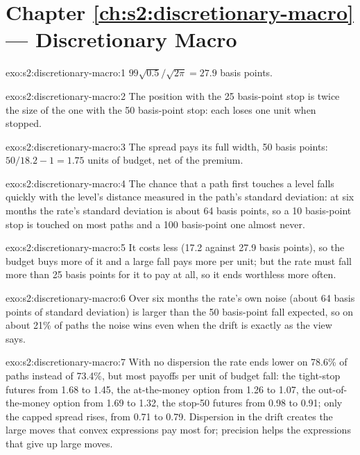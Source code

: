 \section*{Chapter \ref{ch:s2:discretionary-macro} --- Discretionary Macro}

\begin{solution}{exo:s2:discretionary-macro:1}
$99\sqrt{0.5}/\sqrt{2\pi} = 27.9$ basis points.
\end{solution}

\begin{solution}{exo:s2:discretionary-macro:2}
The position with the 25 basis-point stop is twice the size of the one with the 50 basis-point stop: each loses one unit when stopped.
\end{solution}

\begin{solution}{exo:s2:discretionary-macro:3}
The spread pays its full width, 50 basis points: $50/18.2 - 1 = 1.75$ units of budget, net of the premium.
\end{solution}

\begin{solution}{exo:s2:discretionary-macro:4}
The chance that a path first touches a level falls quickly with the level's distance measured in the path's standard deviation: at six months the
rate's standard deviation is about 64 basis points, so a 10 basis-point stop is touched on most paths and a 100 basis-point one almost never.
\end{solution}

\begin{solution}{exo:s2:discretionary-macro:5}
It costs less (17.2 against 27.9 basis points), so the budget buys more of it and a large fall pays more per unit; but the rate must fall more than
25 basis points for it to pay at all, so it ends worthless more often.
\end{solution}

\begin{solution}{exo:s2:discretionary-macro:6}
Over six months the rate's own noise (about 64 basis points of standard deviation) is larger than the 50 basis-point fall expected, so on about 21\%
of paths the noise wins even when the drift is exactly as the view says.
\end{solution}

\begin{solution}{exo:s2:discretionary-macro:7}
With no dispersion the rate ends lower on 78.6\% of paths instead of 73.4\%, but most payoffs per unit of budget fall: the tight-stop futures from 1.68
to 1.45, the at-the-money option from 1.26 to 1.07, the out-of-the-money option from 1.69 to 1.32, the stop-50 futures from 0.98 to 0.91; only the
capped spread rises, from 0.71 to 0.79. Dispersion in the drift creates the large moves that convex expressions pay most for; precision helps
the expressions that give up large moves.
\end{solution}

